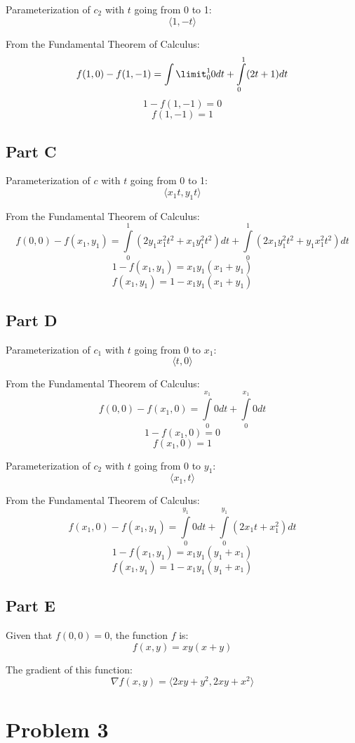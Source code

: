 \documentclass{article}
\begin{document}
Parameterization of $c_2$ with $t$ going from 0 to 1:
$$ \langle 1, -t \rangle $$

From the Fundamental Theorem of Calculus:
$$ f(1, 0) - f(1,-1) = \int\limit_0^1 0 dt + \int\limits_0^1 (2t + 1) dt $$
$$ 1 - f(1, -1) = 0 $$
$$ f(1, -1) = 1 $$ 

\subsection*{Part C}

Parameterization of $c$ with $t$ going from 0 to 1:
$$ \langle x_1 t, y_1 t \rangle $$

From the Fundamental Theorem of Calculus:
$$ f(0, 0) - f(x_1, y_1) = \int\limits_0^1 ( 2 y_1 x_1^2 t^2 + x_1 y_1^2 t^2 )
dt + \int\limits_0^1 (2 x_1 y_1^2 t^2 + y_1 x_1^2 t^2) dt $$
$$ 1 - f(x_1, y_1) = x_1 y_1 (x_1 + y_1) $$
$$ f(x_1, y_1) = 1 - x_1 y_1 (x_1 + y_1) $$

\subsection*{Part D}

Parameterization of $c_1$ with $t$ going from 0 to $x_1$:
$$ \langle t, 0 \rangle $$

From the Fundamental Theorem of Calculus:
$$ f(0, 0) - f(x_1, 0) = \int\limits_0^{x_1} 0 dt + \int\limits_0^{x_1} 0 dt $$
$$ 1 - f(x_1,0) = 0 $$
$$ f(x_1, 0) = 1 $$

Parameterization of $c_2$ with $t$ going from 0 to $y_1$:
$$ \langle x_1, t \rangle $$

From the Fundamental Theorem of Calculus:
$$ f(x_1, 0) - f(x_1, y_1) = \int\limits_0^{y_1} 0 dt + \int\limits_0^{y_1}
(2 x_1 t + x_1^2 ) dt $$
$$ 1 - f(x_1, y_1) = x_1 y_1 (y_1 + x_1) $$
$$ f(x_1, y_1) = 1 - x_1 y_1 (y_1 + x_1) $$

\subsection*{Part E}

Given that $f(0, 0) = 0$, the function $f$ is:
$$ f(x, y) = x y (x + y)$$

The gradient of this function:
$$ \nabla f(x, y) = \langle 2xy + y^2, 2xy + x^2 \rangle $$

\section*{Problem 3}
\end{document}
